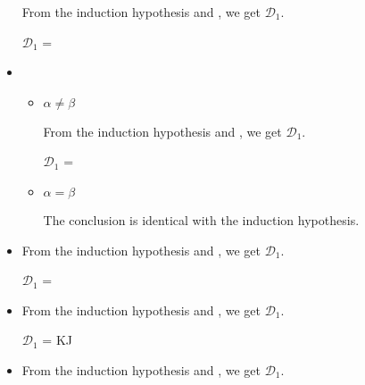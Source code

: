 \begin{itemize}
	      From the induction hypothesis and \QKAbs, we get $\mathcal{D}_1$.
	      	      
	      $\mathcal{D}_1$ = 
	      { \andalso
	      	 }
	      	      
	\item \QKCsp
	      	      
	      \begin{itemize}
	      		      	
	      	\item $\alpha \neq \beta$
	      	      	      	      
	      	      From the induction hypothesis and \QKCsp, we get $\mathcal{D}_1$.
	      	      	      	      
	      	      $\mathcal{D}_1$ = 
	      	      {}
	      	      	      	      
	      	      	      	      
	      	\item $\alpha = \beta$
	      	      	      	      
	      	      The conclusion is identical with the induction hypothesis.
	      	      	      	      
	      \end{itemize}
	      	      
	\item \QKRefl
	      	      
	      From the induction hypothesis and \QKRefl, we get $\mathcal{D}_1$.
	      	      
	      $\mathcal{D}_1$ = 
	      {}
	      	      
	\item \QKSym
	      	      
	      From the induction hypothesis and \QKSym, we get $\mathcal{D}_1$.
	      	      
	      $\mathcal{D}_1$ = 
	      {\GGV K\SB\E J\SB@A\SB}
	      	      
	\item \QKTrans
	      	      
	      From the induction hypothesis and \QKTrans, we get $\mathcal{D}_1$.
	      	      

\end{itemize}
